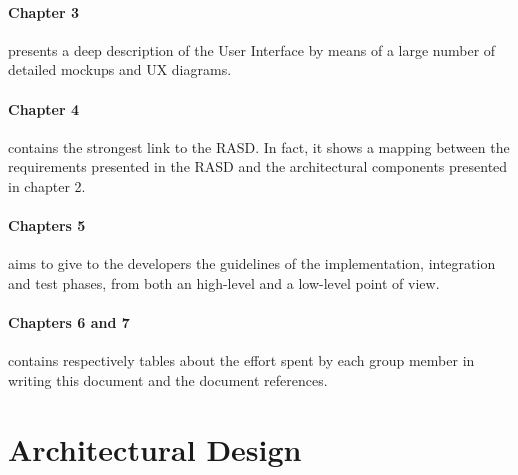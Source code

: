 \documentclass[]{article}
\begin{document}
			\paragraph{Chapter 3} presents a deep description of the User Interface by means of a large number of detailed mockups and UX diagrams.
			
			\paragraph{Chapter 4} contains the strongest link to the RASD. In fact, it shows a mapping between the requirements presented in the RASD and the architectural components presented in chapter 2.
			
			\paragraph{Chapters 5} aims to give to the developers the guidelines of the implementation, integration and test phases, from both an high-level and a low-level point of view.
		
			\paragraph{Chapters 6 and 7} contains respectively tables about the effort spent by each group member in writing this document and the document references.
			\newpage
			
		
		\section{Architectural Design}
			
\end{document}
